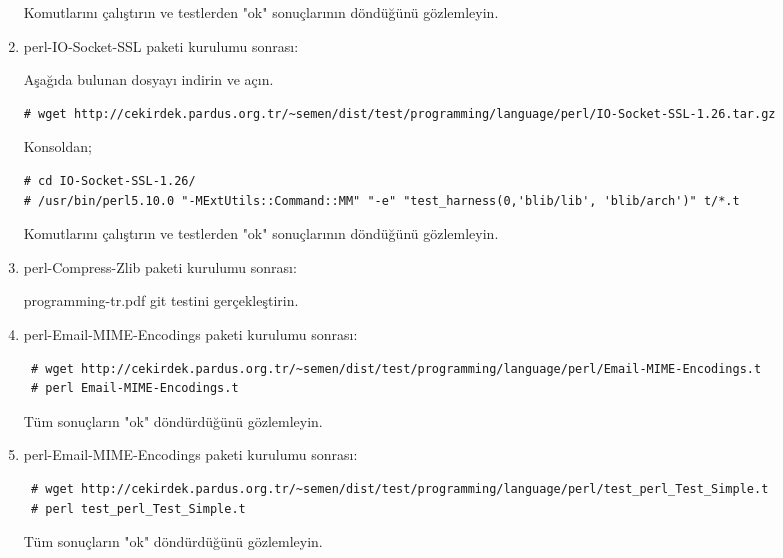 \documentclass[a4paper,10pt]{article}
\begin{document}
\begin{enumerate}
Komutlarını çalıştırın ve testlerden "ok" sonuçlarının döndüğünü gözlemleyin.


\item perl-IO-Socket-SSL paketi kurulumu sonrası:

Aşağıda bulunan dosyayı indirin ve açın.
\begin{verbatim}
# wget http://cekirdek.pardus.org.tr/~semen/dist/test/programming/language/perl/IO-Socket-SSL-1.26.tar.gz
\end{verbatim}

Konsoldan;
\begin{verbatim}
# cd IO-Socket-SSL-1.26/
# /usr/bin/perl5.10.0 "-MExtUtils::Command::MM" "-e" "test_harness(0,'blib/lib', 'blib/arch')" t/*.t
\end{verbatim}

Komutlarını çalıştırın ve testlerden "ok" sonuçlarının döndüğünü gözlemleyin.
\item perl-Compress-Zlib paketi kurulumu sonrası:

programming-tr.pdf git testini gerçekleştirin.

\item perl-Email-MIME-Encodings paketi kurulumu sonrası:
\begin{verbatim}
 # wget http://cekirdek.pardus.org.tr/~semen/dist/test/programming/language/perl/Email-MIME-Encodings.t
 # perl Email-MIME-Encodings.t
\end{verbatim}

Tüm sonuçların "ok" döndürdüğünü gözlemleyin. 

\item perl-Email-MIME-Encodings paketi kurulumu sonrası:
\begin{verbatim}
 # wget http://cekirdek.pardus.org.tr/~semen/dist/test/programming/language/perl/test_perl_Test_Simple.t
 # perl test_perl_Test_Simple.t
\end{verbatim}

Tüm sonuçların "ok" döndürdüğünü gözlemleyin. 


\end{enumerate}
\end{document}
